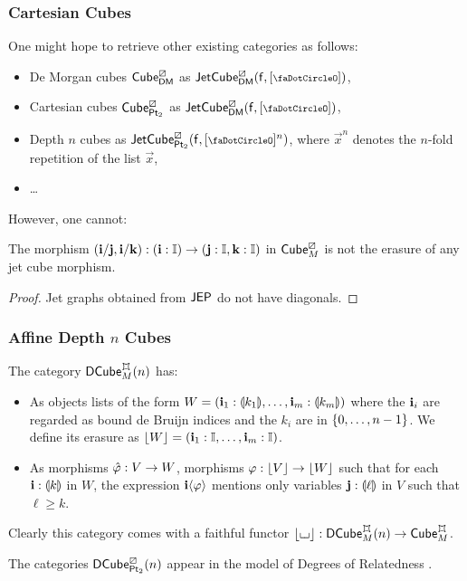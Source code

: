 \documentclass[a4paper]{memoir}
\begin{document}
\subsubsection{Cartesian Cubes}
One might hope to retrieve other existing categories as follows:
\begin{itemize}
	\item De Morgan cubes ${\mathsf{Cube}}^\boxslash_{\mathsf{DM}}$ \cite{cubical} as $\jetcubefwd{\cartes}{\demorgan}{[\npolar]}$,
	\item Cartesian cubes ${\mathsf{Cube}}^\boxslash_{\mathsf{Pt}_2}$ as $\jetcubefwd{\cartes}{\demorgan}{[\npolar]}$,
	\item Depth $n$ cubes \cite{reldtt,reldtt-techreport} as $\jetcubefwd{\cartes}{\bipointed}{[\npolar]^n}$, where $\vec x^n$ denotes the $n$-fold repetition of the list $\vec x$,
	\item \ldots
\end{itemize}
However, one cannot:
\begin{proposition}
	The morphism $(\mathbf{i} / \mathbf{j}, \mathbf{i} / \mathbf{k}) : (\mathbf{i} : {\mathbb I}) \to (\mathbf{j} : {\mathbb I}, \mathbf{k} : {\mathbb I})$ in ${\mathsf{Cube}}^\boxslash_M$ is not the erasure of any jet cube morphism.
\end{proposition}
\begin{proof}
	Jet graphs obtained from $\mathsf{JEP}$ do not have diagonals.
\end{proof}

\subsubsection{Affine Depth $n$ Cubes}
\begin{definition}
	The category $\dcubeopt \mycubex M n$ has:
	\begin{itemize}
		\item As objects lists of the form $W = (\mathbf{i}_1 : {\llparenthesis k_1 \rrparenthesis}, \ldots, \mathbf{i}_m : {\llparenthesis k_m \rrparenthesis})$ where the $\mathbf{i}_i$ are regarded as bound de Bruijn indices and the $k_i$ are in $\mathopen{}\left\{ 0, \ldots, n-1 \right\}\mathclose{}$.
		We define its erasure as $\mathopen{}\left\lfloor W \right\rfloor\mathclose{} = (\mathbf{i}_1 : {\mathbb I}, \ldots, \mathbf{i}_m : {\mathbb I})$.
		\item As morphisms $\hat{\varphi} : V \to W$, morphisms $\varphi : \mathopen{}\left\lfloor V \right\rfloor\mathclose{} \to \mathopen{}\left\lfloor W \right\rfloor\mathclose{}$ such that for each $\mathbf{i} : {\llparenthesis k \rrparenthesis}$ in $W$, the expression $\mathbf{i}\langle \varphi \rangle$ mentions only variables $\mathbf{j} : {\llparenthesis \ell \rrparenthesis}$ in $V$ such that $\ell \geq k$.
	\end{itemize}
	Clearly this category comes with a faithful functor $\erasejc \loch : \dcubeopt \mycubex M n \to \cubecat^\mycubex_M$.
\end{definition}
The categories ${\mathsf{DCube}}^{\boxslash}_{{\mathsf{Pt}_2}}\mathopen{}\left( n \right)\mathclose{}$ appear in the model of Degrees of Relatedness \cite{reldtt,reldtt-techreport}.
\end{document}
